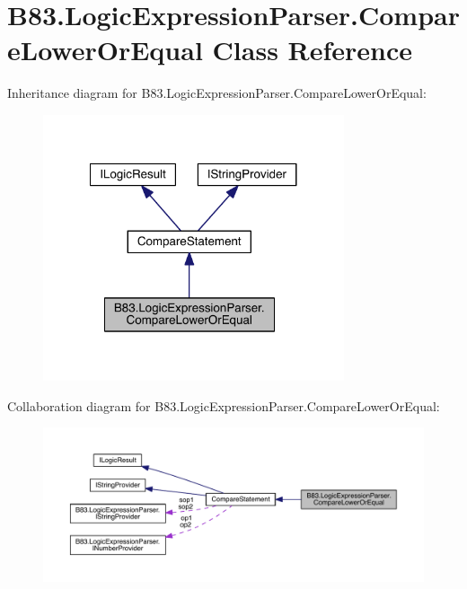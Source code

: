 \hypertarget{class_b83_1_1_logic_expression_parser_1_1_compare_lower_or_equal}{}\section{B83.\+Logic\+Expression\+Parser.\+Compare\+Lower\+Or\+Equal Class Reference}
\label{class_b83_1_1_logic_expression_parser_1_1_compare_lower_or_equal}


Inheritance diagram for B83.\+Logic\+Expression\+Parser.\+Compare\+Lower\+Or\+Equal\+:\nopagebreak
\begin{figure}[H]
\begin{center}
\leavevmode
\includegraphics[width=251pt]{class_b83_1_1_logic_expression_parser_1_1_compare_lower_or_equal__inherit__graph}
\end{center}
\end{figure}


Collaboration diagram for B83.\+Logic\+Expression\+Parser.\+Compare\+Lower\+Or\+Equal\+:\nopagebreak
\begin{figure}[H]
\begin{center}
\leavevmode
\includegraphics[width=350pt]{class_b83_1_1_logic_expression_parser_1_1_compare_lower_or_equal__coll__graph}
\end{center}
\end{figure}
